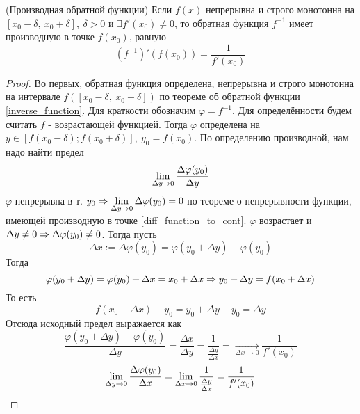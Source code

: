 \begin{theorem} \label{inverse_function_derivative}
	(Производная обратной функции)
	Если $f(x)$ непрерывна и строго монотонна на
	$[x_0 - \delta,\ x_0 + \delta],\ \delta > 0$ и $\exists f'(x_0) \neq 0$,
	то обратная функция $f^{-1}$ имеет производную в точке
	$f(x_0)$, равную
	\[
		(f^{-1})'(f(x_0)) = \frac{1}{f'(x_0)}
	\]
\end{theorem}

\begin{proof}
	Во первых, обратная функция определена, непрерывна и
	строго монотонна на интервале $f([x_0 - \delta,\ x_0 + \delta])$ по
	теореме об обратной функции \ref{inverse_function}.
	Для краткости обозначим $\varphi = f^{-1}$. Для определённости
	будем считать $f$ - возрастающей функцией. Тогда $\varphi$
	определена на $y \in [f(x_0 - \delta); f(x_0 + \delta)],\ y_0 = f(x_0)$.
	По определению производной, нам надо найти предел
	\[
		\lim\limits_{\Delta y \to 0} \frac{\Delta \varphi(y_0)}{\Delta y}
	\]
	$\varphi$ непрерывна в т. $y_0 \Rightarrow
	\lim\limits_{\Delta y \to 0} \Delta \varphi(y_0) = 0$
	по теореме о непрерывности функции, имеющей производную в точке
	\ref{diff_function_to_cont}. $\varphi$ возрастает и
	$\Delta y \neq 0 \Rightarrow \Delta \varphi(y_0) \neq 0$. Тогда пусть
	\[
		\Delta x := \Delta \varphi(y_0) =
		\varphi(y_0 + \Delta y) - \varphi(y_0)
	\]
	Тогда
	\[
		\varphi(y_0 + \Delta y) = \varphi(y_0) + \Delta x =
		x_0 + \Delta x \Rightarrow y_0 + \Delta y = f(x_0 + \Delta x)
	\]
	То есть
	\[
		f(x_0 + \Delta x) - y_0 = y_0 + \Delta y - y_0 = \Delta y
	\]
	Отсюда исходный предел выражается как
	\[
		\frac{\varphi(y_0 + \Delta y) -
		\varphi(y_0)}{\Delta y} =
		\frac{\Delta x}{\Delta y} =
		\frac{1}{\frac{\Delta y}{\Delta x}} =
		\underset{\Delta x \to 0}{\to}		
		\frac{1}{f'(x_0)}
	\]
	\[
		\lim\limits_{\Delta y \to 0} \frac{\Delta \varphi(y_0)}{\Delta x}=
		\lim\limits_{\Delta x \to 0} \frac{1}{\frac{\Delta y}{\Delta x}} =
		\frac{1}{f'(x_0)}
	\]
\end{proof}

